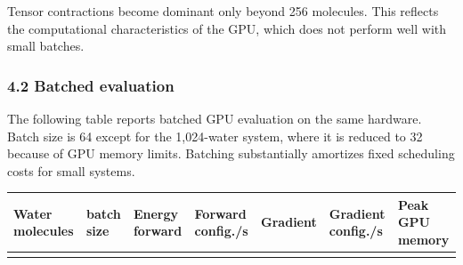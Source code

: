 Tensor contractions become dominant only beyond 256 molecules. This reflects the computational characteristics of the GPU, which does not perform well with small batches.

\subsubsection{4.2 Batched evaluation}\label{sec:batched-evaluation}

The following table reports batched GPU evaluation on the same hardware. Batch size is 64 except for the 1,024-water system, where it is reduced to 32 because of GPU memory limits.
Batching substantially amortizes fixed scheduling costs for small systems.

\begingroup
\small
\setlength{\tabcolsep}{4pt}
\begin{longtable}[]{@{}
  >{\raggedleft\arraybackslash}p{}
  >{\raggedleft\arraybackslash}p{}
  >{\raggedleft\arraybackslash}p{}
  >{\raggedleft\arraybackslash}p{}
  >{\raggedleft\arraybackslash}p{}
  >{\raggedleft\arraybackslash}p{}
  >{\raggedleft\arraybackslash}p{}@{}}
\toprule\noalign{}
\begin{minipage}[b]{\linewidth}\raggedleft
Water molecules
\end{minipage} & \begin{minipage}[b]{\linewidth}\raggedleft
batch size
\end{minipage} & \begin{minipage}[b]{\linewidth}\raggedleft
Energy forward
\end{minipage} & \begin{minipage}[b]{\linewidth}\raggedleft
Forward config./s
\end{minipage} & \begin{minipage}[b]{\linewidth}\raggedleft
Gradient
\end{minipage} & \begin{minipage}[b]{\linewidth}\raggedleft
Gradient config./s
\end{minipage} & \begin{minipage}[b]{\linewidth}\raggedleft
Peak GPU memory
\end{minipage} \\
\midrule\noalign{}

\end{longtable}
